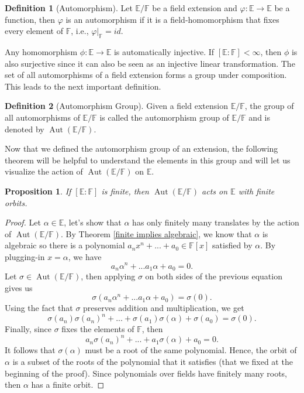 \documentclass{article}
\theoremstyle{plain}
\newtheorem{proposition}[theorem]{Proposition}
\theoremstyle{definition}
\newtheorem*{definition}{Definition}
\newcommand{\F}{\mathbb{F}}
\newcommand{\E}{\mathbb{E}}
\DeclareMathOperator{\Aut}{Aut}
\begin{document}
\begin{definition}[Automorphism]
    Let $\E / \F$ be a field extension and $\varphi : \E \to \E$ be a function, then $\varphi$ is an automorphism if it is a field-homomorphism that fixes every element of $\F$, i.e., $\varphi|_{\F} = id$.
\end{definition}

Any homomorphism $\phi : \E \to \E$ is automatically injective. If $[\E : \F] < \infty$, then $\phi$ is also surjective since it can also be seen as an injective linear transformation. The set of all automorphisms of a field extension forms a group under composition. This leads to the next important definition.

\begin{definition}[Automorphism Group]
    Given a field extension $\E / \F$, the group of all automorphisms of $\E / \F$ is called the automorphism group of $\E / \F$ and is denoted by $\Aut(\E / \F)$.
\end{definition}

Now that we defined the automorphism group of an extension, the following theorem will be helpful to understand the elements in this group and will let us visualize the action of $\Aut(\E / \F)$ on $\E$. 

\begin{proposition}
\label{finite orbits}
    If $[\E : \F]$ is finite, then $\Aut(\E / \F)$ acts on $\E$ with finite orbits.
\end{proposition}

\begin{proof}
    Let $\alpha \in \E$, let's show that $\alpha$ has only finitely many translates by the action of $\Aut(\E / \F)$. By Theorem \ref{finite implies algebraic}, we know that $\alpha$ is algebraic so there is a polynomial $a_n x^n + ... + a_0 \in \F[x]$ satisfied by $\alpha$.  By plugging-in $x = \alpha$, we have
    $$a_n \alpha^n + ... a_1 \alpha + a_0 = 0.$$
    Let $\sigma \in \Aut(\E / \F)$, then applying $\sigma$ on both sides of the previous equation gives us 
    $$\sigma(a_n \alpha^n + ... a_1 \alpha + a_0) = \sigma(0).$$
    Using the fact that $\sigma$ preserves addition and multiplication, we get
    $$\sigma(a_n)\sigma(a_n)^n + ... + \sigma(a_1)\sigma(\alpha) + \sigma(a_0) = \sigma(0).$$
    Finally, since $\sigma$ fixes the elements of $\F$, then 
    $$a_n\sigma(a_n)^n + ... + a_1\sigma(\alpha) + a_0 = 0.$$
    It follows that $\sigma(\alpha)$ must be a root of the same polynomial. Hence, the orbit of $\alpha$ is a subset of the roots of the polynomial that it satisfies (that we fixed at the beginning of the proof). Since polynomials over fields have finitely many roots, then $\alpha$ has a finite orbit.
\end{proof}
\end{document}
